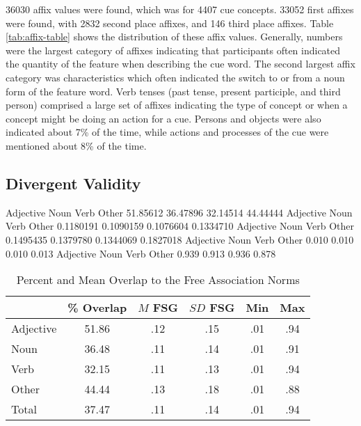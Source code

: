 \documentclass[english,man]{apa6}
\theoremstyle{definition}
\theoremstyle{definition}
\theoremstyle{definition}
\theoremstyle{remark}
\begin{document}
36030 affix values were found, which was for 4407 cue concepts. 33052
first affixes were found, with 2832 second place affixes, and 146 third
place affixes. Table \ref{tab:affix-table} shows the distribution of
these affix values. Generally, numbers were the largest category of
affixes indicating that participants often indicated the quantity of the
feature when describing the cue word. The second largest affix category
was characteristics which often indicated the switch to or from a noun
form of the feature word. Verb tenses (past tense, present participle,
and third person) comprised a large set of affixes indicating the type
of concept or when a concept might be doing an action for a cue. Persons
and objects were also indicated about 7\% of the time, while actions and
processes of the cue were mentioned about 8\% of the time.

\subsection{Divergent Validity}\label{divergent-validity}

Adjective Noun Verb Other 51.85612 36.47896 32.14514 44.44444 Adjective
Noun Verb Other 0.1180191 0.1090159 0.1076604 0.1334710 Adjective Noun
Verb Other 0.1495435 0.1379780 0.1344069 0.1827018 Adjective Noun Verb
Other 0.010 0.010 0.010 0.013 Adjective Noun Verb Other 0.939 0.913
0.936 0.878

\begin{table}[tbp]
\begin{center}
\begin{threeparttable}
\caption{\label{tab:divergent-table}Percent and Mean Overlap to the Free Association Norms}
\begin{tabular}{lccccc}
\toprule
  & \% Overlap & $M$ FSG & $SD$ FSG & Min & Max\\
\midrule
Adjective & 51.86 & .12 & .15 & .01 & .94\\
Noun & 36.48 & .11 & .14 & .01 & .91\\
Verb & 32.15 & .11 & .13 & .01 & .94\\
Other & 44.44 & .13 & .18 & .01 & .88\\
Total & 37.47 & .11 & .14 & .01 & .94\\
\bottomrule
\end{tabular}
\end{threeparttable}
\end{center}
\end{table}
\end{document}
